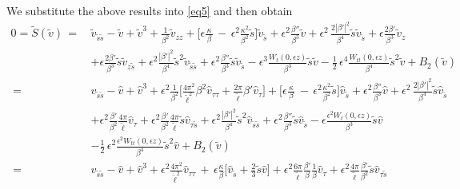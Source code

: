 \documentclass[10pt, reqno]{amsart}
\numberwithin{equation}{section}
\theoremstyle{definition}
\begin{document}
{\medskip
We substitute the above results into \eqref{eq5} and then obtain
\begin{align}
0= {\tilde S}({\tilde v})
\,=\,&
{\tilde v}_{{\tilde s}{\tilde s}} - {\tilde v}+{\tilde v}^3 +\frac{1}{\beta^2} {\tilde v}_{zz} + \Bigg[\epsilon \frac{\kappa}{\, \beta\, }
\,-\, \epsilon^2\frac{\kappa^2}{\beta^2} {\tilde s}\Bigg] {\tilde v}_{\tilde s}
+\epsilon^2\frac{\beta''} {\beta^3}{\tilde v}
+ \epsilon^2\, \frac{2|\beta'|^2}{\beta^4} {\tilde s} {\tilde v}_{\tilde s}
+\epsilon \frac{2\beta'} {\beta^3}{\tilde v}_z
\nonumber\\[2mm]
&
+ \epsilon \frac{2\beta'}{\beta^3} {\tilde s} {\tilde v}_{z{\tilde s}}
+ \epsilon^2 \frac{|\beta'|^2}{\beta^4}{\tilde s}^2 {\tilde v}_{{\tilde s}{\tilde s}}
+ \epsilon^2 \frac{\beta''}{\beta^3} {\tilde s} {\tilde v}_{\tilde s}
- \epsilon^3 \frac{W_t(0, \epsilon z)}{\beta^3} {\tilde s} {\tilde v}
-\frac{1}{2}\, \epsilon^4\frac{W_{tt}(0, \epsilon z)}{\beta^4} {\tilde s}^2 {\tilde v}
+ B_2 ({\tilde v})
\nonumber\\[2mm]
\,=\,
&{\hat v}_{{\tilde s}{\tilde s}} - {\hat v} + {\hat v}^3
+\epsilon^2\frac{1}{\beta^2}\Bigg[\frac{4\pi^2}{{\tilde\ell}^2} \beta^{2} {\hat v}_{\tau\tau}
+\frac{2\pi}{ {\tilde\ell}}\beta'{\hat v}_\tau
\Bigg]
+ \Big[\epsilon \frac{\kappa}{\, \beta\, }\,-\, \epsilon^2\frac{\kappa^2}{\beta^2} {\tilde s}\Big] {\hat v}_{\tilde s}
+\epsilon^2\frac{\beta''} {\beta^3}{\hat v}
+ \epsilon^2\, \frac{2|\beta'|^2}{\beta^4} {\tilde s} {\hat v}_{\tilde s}
\nonumber\\[2mm]
&
+\epsilon^2 \frac{\beta'} {\beta^2}\frac{4\pi}{{\tilde\ell}}{\hat v}_\tau
+ \epsilon^2 \frac{\beta'}{\beta^2} \frac{4\pi}{{\tilde\ell}} {\tilde s}{\hat v}_{\tau {\tilde s}}
+ \epsilon^2 \frac{|\beta'|^2}{\beta^4}{\tilde s}^2 {\hat v}_{{\tilde s}{\tilde s}}
+ \epsilon^2 \frac{\beta''}{\beta^3} {\tilde s} {\hat v}_{\tilde s}
- \epsilon \frac{\epsilon^2W_t(0, \epsilon z)}{\beta^3} {\tilde s} {\hat v}
\nonumber\\[2mm]
&-\frac{1}{2}\, \epsilon^2\frac{\epsilon^2W_{tt}(0, \epsilon z)}{\beta^4} {\tilde s}^2 {\hat v}
+ B_2 ({\tilde v})
\nonumber\\[2mm]
\,=\,&{\hat v}_{{\tilde s}{\tilde s}} - {\hat v} + {\hat v}^3
+\epsilon^2\frac{4\pi^2}{{\tilde\ell}^2} {\hat v}_{\tau\tau}
\,+\,\epsilon \frac{\kappa}{\beta} \Bigg[ {\hat v}_{\tilde s} +\frac 2 3 {\tilde s}{\hat v}\Bigg]
+\epsilon^2\frac{6\pi}{{\tilde\ell}}\frac{\beta'} {\beta}\frac{1}{\beta}{\hat v}_\tau
+\epsilon^2 \frac{4\pi}{{\tilde\ell}} \frac{\beta'}{\beta^2} {\tilde s}{\hat v}_{\tau {\tilde s}}

\end{align}}
\end{document}
